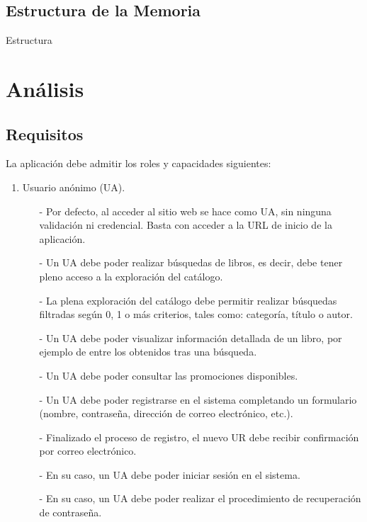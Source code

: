 \documentclass[a4paper]{article}
\begin{document}
    \subsection{Estructura de la Memoria}
    Estructura

    \section{Análisis}
        \subsection{Requisitos}

            La aplicación debe admitir los roles y capacidades siguientes:
            \begin{enumerate}
                \item Usuario anónimo (UA).
                \begin{itemize}
                    \item[-] Por defecto, al acceder al sitio web se hace como UA, sin ninguna validación ni credencial. Basta con acceder a la URL de inicio de la aplicación.
                    \item[-] Un UA debe poder realizar búsquedas de libros, es decir, debe tener pleno acceso a la exploración del catálogo.
                    \item[-] La plena exploración del catálogo debe permitir realizar búsque\-das filtradas según 0, 1 o más criterios, tales como: categoría, título o autor.
                    \item[-] Un UA debe poder visualizar información detallada de un libro, por ejemplo de entre los obtenidos tras una búsqueda.
                    \item[-] Un UA debe poder consultar las promociones disponibles.
                    \item[-] Un UA debe poder registrarse en el sistema completando un formulario (nombre, contraseña, dirección de correo electrónico, etc.).
                    \item[-] Finalizado el proceso de registro, el nuevo UR debe recibir confirmación por correo electrónico.
                    \item[-] En su caso, un UA debe poder iniciar sesión en el sistema.
                    \item[-] En su caso, un UA debe poder realizar el procedimiento de recuperación de contraseña.
                \end{itemize}

\end{enumerate}
\end{document}
